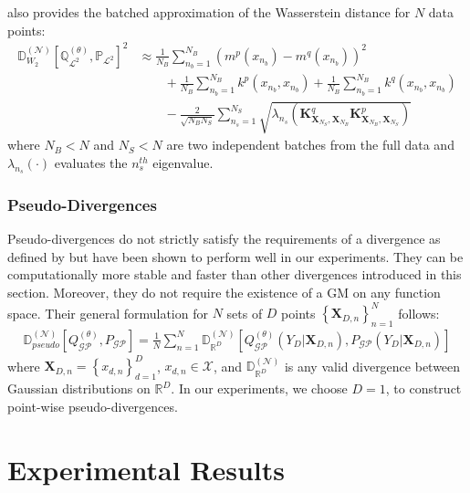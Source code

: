 \documentclass{article}
\newcommand{\GP}{\operatorname{\mathcal{GP}}}
\numberwithin{equation}{section}
\begin{document}
\cite{wild2022generalized} also provides the batched approximation of the Wasserstein distance for $N$ data points:
\begin{align}
    \mathbb{D}_{W_2}^{(\mathcal{N})} \left[\mathbb{Q}^{(\theta)}_{\mathcal{L}^2}, \mathbb{P}_{\mathcal{L}^2}\right]^2 &\approx \frac{1}{N_B}\sum_{n_b=1}^{N_B} \left(m^p(x_{n_b}) - m^q(x_{n_b})\right)^2 \nonumber \\
    & \qquad + \frac{1}{N_B} \sum_{n_b=1}^{N_B} k^p(x_{n_b}, x_{n_b}) + \frac{1}{N_B} \sum_{n_b=1}^{N_B} k^q(x_{n_b}, x_{n_b}) \nonumber \\
    & \qquad - \frac{2}{\sqrt{N_B N_S}} \sum_{n_s=1}^{N_S} \sqrt{\lambda_{n_s}\left(\mathbf{K}^q_{\mathbf{X}_{N_S}, \mathbf{X}_{N_B}}\mathbf{K}^p_{\mathbf{X}_{N_B}, \mathbf{X}_{N_S}}\right)}
    \label{wasserstein-distance-approximation}
\end{align}
where $N_B < N$ and $N_S < N$ are two independent batches from the full data and $\lambda_{n_s}(\cdot)$ evaluates the $n_s^{th}$ eigenvalue. 

\subsubsection{Pseudo-Divergences}
Pseudo-divergences do not strictly satisfy the requirements of a divergence as defined by \cite{knoblauch2022optimization} but have been shown to perform well in our experiments. They can be computationally more stable and faster than other divergences introduced in this section. Moreover, they do not require the existence of a GM on any function space. Their general formulation for $N$ sets of $D$ points $\left\{\mathbf{X}_{D, n}\right\}_{n=1}^N$ follows:
\begin{align}
    \mathbb{D}_{pseudo}^{(\mathcal{N})} \left[Q_{\GP}^{(\theta)}, P_{\GP}\right] = \frac{1}{N}\sum_{n=1}^N \mathbb{D}_{\mathbb{R}^D}^{(\mathcal{N})}\left[Q_{\GP}^{(\theta)}(Y_D\vert \mathbf{X}_{D, n}), P_{\GP}(Y_D\vert \mathbf{X}_{D, n})\right]
\end{align}
where $\mathbf{X}_{D, n}=\left\{x_{d, n}\right\}_{d=1}^D$, $x_{d, n} \in \mathcal{X}$, and $\mathbb{D}_{\mathbb{R}^D}^{(\mathcal{N})}$ is any valid divergence between Gaussian distributions on $\mathbb{R}^D$. In our experiments, we choose $D=1$, to construct point-wise pseudo-divergences.

\newpage
\section{Experimental Results}
\end{document}
